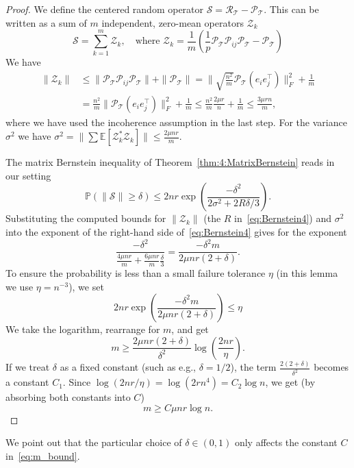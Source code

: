 \begin{proof}
We define the centered random operator $\mathcal{S} = \mathcal{R}_{\mathcal{T}} - \mathcal{P}_{\mathcal{T}}$. This can be written as a sum of $m$ independent, zero-mean operators $\mathcal{Z}_k$
$$\mathcal{S} = \sum_{k=1}^m \mathcal{Z}_k, \quad \text{where } \mathcal{Z}_k = \frac{1}{m} \left( \frac{1}{p} \mathcal{P}_{\mathcal{T}} \mathcal{P}_{ij} \mathcal{P}_{\mathcal{T}} - \mathcal{P}_{\mathcal{T}} \right)$$
We have 
\begin{align*}
\|\mathcal{Z}_k\|  &\le \|\mathcal{P}_{\mathcal{T}} \mathcal{P}_{ij} \mathcal{P}_{\mathcal{T}}\| + \|\mathcal{P}_{\mathcal{T}}\| 
=
\Big\| \sqrt{\frac{n^2}{m}} \mathcal{P}_{\mathcal{T}}(e_i e_j^\top) \Big\|_F^2 + \frac{1}{m} \\ &
= \frac{n^2}{m} \|\mathcal{P}_{\mathcal{T}}(e_i e_j^\top)\|_F^2 + \frac{1}{m} \le \frac{n^2}{m}\frac{2\mu r}{n} + \frac{1}{m}\le \frac{3\mu r n}{m},
\end{align*}
where we have used the incoherence assumption in the last step. For the variance $\sigma^2$ we have $\sigma^2 = \| \sum \mathbb{E}[\mathcal{Z}_k^* \mathcal{Z}_k] \| \le \frac{2\mu n r}{m}$.

The matrix Bernstein inequality of Theorem~\ref{thm:4:MatrixBernstein} reads in our setting
\begin{equation}\label{eq:Bernstein4}
\mathbb{P}(\|\mathcal{S}\| \ge \delta) \le 2nr \exp \left( \frac{-\delta^2}{2\sigma^2 + 2R\delta/3} \right).\end{equation}
Substituting the computed bounds for $\|\mathcal{Z}_k\|$ (the $R$ in~\eqref{eq:Bernstein4}) and $\sigma^2$ into the exponent of the right-hand side of~\eqref{eq:Bernstein4} gives for the exponent
$$\frac{-\delta^2}{\frac{4\mu n r}{m} + \frac{6\mu n r}{m} \frac{\delta}{3}} = \frac{-\delta^2  m}{2\mu n r (2 + \delta)}.$$
To ensure the probability is less than a small failure tolerance $\eta$ (in this lemma we use $\eta = n^{-3}$), we set
$$2nr \exp \left( \frac{-\delta^2 m}{2 \mu n r (2 + \delta)} \right) \le \eta$$
We take the logarithm, rearrange for $m$, and get
$$m \ge \frac{2 \mu n r (2 + \delta)}{\delta^2} \log\left(\frac{2nr}{\eta}\right).$$
If we treat $\delta$ as a fixed constant (such as e.g., $\delta = 1/2$), the term $\frac{2(2 + \delta)}{\delta^2}$ becomes a constant $C_1$. Since $\log(2nr/\eta) = \log(2r n^4) = C_2 \log n$, we get (by absorbing both constants into $C$)
\begin{equation}\label{eq:m_bound}
m \ge C \mu n r \log n.
\end{equation}
 
\end{proof}
We point out that the particular choice of $\delta \in (0,1)$ only affects the constant $C$ in~\eqref{eq:m_bound}.

